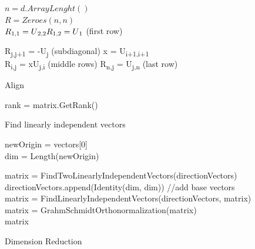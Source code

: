 \documentclass[a4paper,twoside]{bth}
\begin{document}
\begin{algorithm}[H]
 $n = d.ArrayLenght()$\\
 $R = Zeroes(n, n)$\\
 
 $R\textsubscript{1,1} = U\textsubscript{2,2}
 R\textsubscript{1,2} = U\textsubscript{1}$ (first row)
 
 {
    R\textsubscript{j,j+1} = -U\textsubscript{j} (subdiagonal)
 }
 {
    x = U\textsubscript{i+1,i+1}\\
    {
        R\textsubscript{i,j} = xU\textsubscript{j,i} (middle rows)
    }
 }
 {
    R\textsubscript{n,j} = U\textsubscript{j,n} (last row)
 }
 
 \caption{Align}
\end{algorithm}



\begin{algorithm}[H]
 rank = matrix.GetRank()\\
 \caption{Find linearly independent vectors}
 \label{al:findindependentvecs}
\end{algorithm}

\begin{algorithm}[H]
 newOrigin = vectors[0]\\
 dim = Length(newOrigin)\\

  matrix = FindTwoLinearlyIndependentVectors(directionVectors)\\
 
 directionVectors.append(Identity(dim, dim)) \quad\quad\quad//add base vectors\\
 
 matrix = FindLinearlyIndependentVectors(directionVectors, matrix)\\
 matrix = GrahmSchmidtOrthonormalization(matrix)\\
 \Return matrix
 \caption{Dimension Reduction}
 \label{al:dimred}
\end{algorithm}
\end{document}
